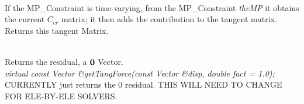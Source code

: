  \\
If the MP\_Constraint is time-varying, from the MP\_Constraint
{\em theMP} it obtains the current $C_{cr}$ matrix; it then adds the
contribution to the tangent matrix. Returns this tangent Matrix.

 \\
Returns the residual, a ${\bf 0}$ Vector. \\

{\em virtual const Vector \&getTangForce(const Vector \&disp, double
fact = 1.0);    }\\
CURRENTLY just returns the $0$ residual. THIS WILL NEED TO CHANGE FOR
ELE-BY-ELE SOLVERS. 

